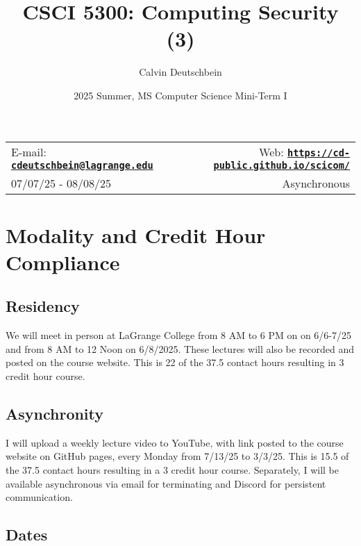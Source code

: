 \documentclass[11pt]{article}
\title{CSCI 5300: Computing Security (3)}
\author{Calvin Deutschbein}
\date{2025 Summer, MS Computer Science Mini-Term I}
\newcommand{\blankline}{\quad\pagebreak[2]}
\begin{document}
\maketitle

\blankline

\begin{tabular*}{\textwidth}{@{\extracolsep{\fill}}lr}


E-mail: \href{mailto:cdeutschbein@lagrange.edu}{\tt\bf cdeutschbein@lagrange.edu} & Web: \href{https://cd-public.github.io/scicom/}{\tt\bf https://cd-public.github.io/scicom/}  \\

07/07/25 - 08/08/25 &  Asynchronous \\
\hline
\end{tabular*}

\vspace{5 mm}


\section*{Modality and Credit Hour Compliance}

\subsection*{Residency}  

We will meet in person at LaGrange College from 8 AM to 6 PM on on 6/6-7/25
and from 8 AM to 12 Noon on 6/8/2025. These lectures will also be recorded and posted on
the course website. This is 22 of the 37.5 contact hours resulting in 3 credit hour course.

\subsection*{Asynchronity} 

I will upload a weekly lecture video to YouTube, with link posted to the course
website on GitHub pages, every Monday from 7/13/25 to 3/3/25. This is 15.5 of the 37.5 contact
hours resulting in a 3 credit hour course. Separately, I will be available asynchronous via email
for terminating and Discord for persistent communication.

\subsection*{Dates}
\end{document}
